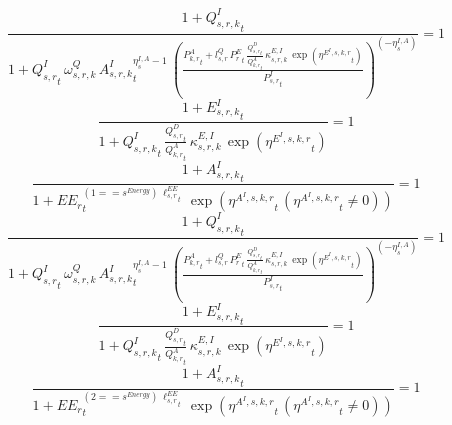 \noindent[name= `regional sector demand for intermediates from aggregate sector 5 1 1']
\begin{dmath}
\frac{1+{{Q^{I}_{s,r,k}}}_{t}}{1+{{Q^{I}_{s,r}}}_{t}\, {{\omega^{Q}_{s,r,k}}}\, {{A^{I}_{s,r,k}}}_{t}^{{{\eta^{I,A}_{s}}}-1}\, \left(\frac{{{P^{A}_{k,r}}}_{t}+{{l^{Q}_{s,r}}}\, {{P^E_r}}_{t}\, \frac{{{Q^{D}_{s,r}}}_{t}}{{{Q^{A}_{k,r}}}_{t}}\, {{\kappa^{E,I}_{s,r,k}}}\, \exp\left({{\eta^{E^{I},s,k,r}}}_{t}\right)}{{{P^{I}_{s,r}}}_{t}}\right)^{\left(-{{\eta^{I,A}_{s}}}\right)}}=1
\end{dmath}
\noindent[name= `regional emissions caused by using intermediates from aggregate sector 5 1 1']
\begin{dmath}
\frac{1+{{E^I_{s,r,k}}}_{t}}{1+{{Q^{I}_{s,r,k}}}_{t}\, \frac{{{Q^{D}_{s,r}}}_{t}}{{{Q^{A}_{k,r}}}_{t}}\, {{\kappa^{E,I}_{s,r,k}}}\, \exp\left({{\eta^{E^{I},s,k,r}}}_{t}\right)}=1
\end{dmath}
\noindent[name= `productivity of intermediates in subsector 5 region 1 from sector 1']
\begin{dmath}
\frac{1+{{A^{I}_{s,r,k}}}_{t}}{1+{{EE_r}}_{t}^{\left(1=={{s^{Energy}}}\right)\, {{\ell^{EE}_{s,r}}}_{t}}\, \exp\left({{\eta^{A^{I},s,k,r}}}_{t}\, \left({{\eta^{A^{I},s,k,r}}}_{t}\neq 0\right)\right)}=1
\end{dmath}
\noindent[name= `regional sector demand for intermediates from aggregate sector 5 1 2']
\begin{dmath}
\frac{1+{{Q^{I}_{s,r,k}}}_{t}}{1+{{Q^{I}_{s,r}}}_{t}\, {{\omega^{Q}_{s,r,k}}}\, {{A^{I}_{s,r,k}}}_{t}^{{{\eta^{I,A}_{s}}}-1}\, \left(\frac{{{P^{A}_{k,r}}}_{t}+{{l^{Q}_{s,r}}}\, {{P^E_r}}_{t}\, \frac{{{Q^{D}_{s,r}}}_{t}}{{{Q^{A}_{k,r}}}_{t}}\, {{\kappa^{E,I}_{s,r,k}}}\, \exp\left({{\eta^{E^{I},s,k,r}}}_{t}\right)}{{{P^{I}_{s,r}}}_{t}}\right)^{\left(-{{\eta^{I,A}_{s}}}\right)}}=1
\end{dmath}
\noindent[name= `regional emissions caused by using intermediates from aggregate sector 5 1 2']
\begin{dmath}
\frac{1+{{E^I_{s,r,k}}}_{t}}{1+{{Q^{I}_{s,r,k}}}_{t}\, \frac{{{Q^{D}_{s,r}}}_{t}}{{{Q^{A}_{k,r}}}_{t}}\, {{\kappa^{E,I}_{s,r,k}}}\, \exp\left({{\eta^{E^{I},s,k,r}}}_{t}\right)}=1
\end{dmath}
\noindent[name= `productivity of intermediates in subsector 5 region 1 from sector 2']
\begin{dmath}
\frac{1+{{A^{I}_{s,r,k}}}_{t}}{1+{{EE_r}}_{t}^{\left(2=={{s^{Energy}}}\right)\, {{\ell^{EE}_{s,r}}}_{t}}\, \exp\left({{\eta^{A^{I},s,k,r}}}_{t}\, \left({{\eta^{A^{I},s,k,r}}}_{t}\neq 0\right)\right)}=1
\end{dmath}
